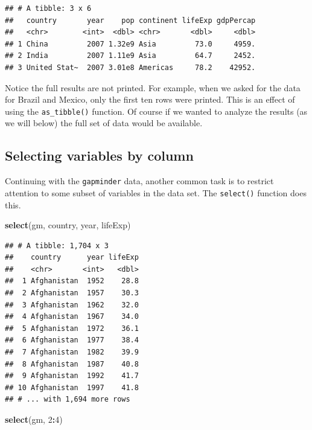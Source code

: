 \documentclass[
]{krantz}
\newenvironment{Shaded}{\begin{snugshade}}{\end{snugshade}}
\newcommand{\DecValTok}[1]{\textcolor[rgb]{0.00,0.00,0.81}{#1}}
\newcommand{\KeywordTok}[1]{\textcolor[rgb]{0.13,0.29,0.53}{\textbf{#1}}}
\newcommand{\NormalTok}[1]{#1}
\newcommand{\OperatorTok}[1]{\textcolor[rgb]{0.81,0.36,0.00}{\textbf{#1}}}
\begin{document}
\begin{verbatim}
## # A tibble: 3 x 6
##   country       year    pop continent lifeExp gdpPercap
##   <chr>        <int>  <dbl> <chr>       <dbl>     <dbl>
## 1 China         2007 1.32e9 Asia         73.0     4959.
## 2 India         2007 1.11e9 Asia         64.7     2452.
## 3 United Stat~  2007 3.01e8 Americas     78.2    42952.
\end{verbatim}

Notice the full results are not printed. For example, when we asked for the data for Brazil and Mexico, only the first ten rows were printed. This is an effect of using the \texttt{as\_tibble()} function. Of course if we wanted to analyze the results (as we will below) the full set of data would be available.

\hypertarget{selecting-variables-by-column}{%
\subsection{Selecting variables by column}\label{selecting-variables-by-column}}

Continuing with the \texttt{gapminder} data, another common task is to restrict attention to some subset of variables in the data set. The \texttt{select()} function does this.

\begin{Shaded}
\begin{Highlighting}[]
\KeywordTok{select}\NormalTok{(gm, country, year, lifeExp)}
\end{Highlighting}
\end{Shaded}

\begin{verbatim}
## # A tibble: 1,704 x 3
##    country      year lifeExp
##    <chr>       <int>   <dbl>
##  1 Afghanistan  1952    28.8
##  2 Afghanistan  1957    30.3
##  3 Afghanistan  1962    32.0
##  4 Afghanistan  1967    34.0
##  5 Afghanistan  1972    36.1
##  6 Afghanistan  1977    38.4
##  7 Afghanistan  1982    39.9
##  8 Afghanistan  1987    40.8
##  9 Afghanistan  1992    41.7
## 10 Afghanistan  1997    41.8
## # ... with 1,694 more rows
\end{verbatim}

\begin{Shaded}
\begin{Highlighting}[]
\KeywordTok{select}\NormalTok{(gm, }\DecValTok{2}\OperatorTok{:}\DecValTok{4}\NormalTok{)}
\end{Highlighting}
\end{Shaded}
\end{document}
